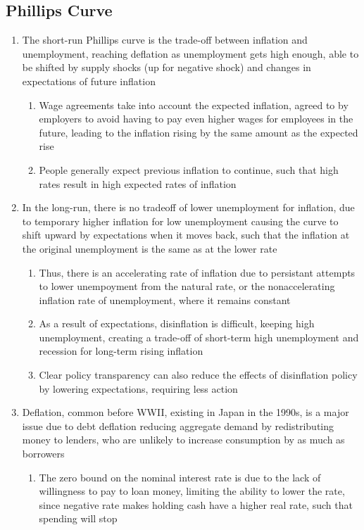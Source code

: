 \subsection{Phillips Curve}
\begin{enumerate}
\item The short-run Phillips curve is the trade-off between inflation and unemployment, reaching deflation as unemployment gets high enough, able to be shifted by supply shocks (up for negative shock) and changes in expectations of future inflation
\begin{enumerate}
\item Wage agreements take into account the expected inflation, agreed to by employers to avoid having to pay even higher wages for employees in the future, leading to the inflation rising by the same amount as the expected rise
\item People generally expect previous inflation to continue, such that high rates result in high expected rates of inflation
\end{enumerate}
\item In the long-run, there is no tradeoff of lower unemployment for inflation, due to temporary higher inflation for low unemployment causing the curve to shift upward by expectations when it moves back, such that the inflation at the original unemployment is the same as at the lower rate
\begin{enumerate}
\item Thus, there is an accelerating rate of inflation due to persistant attempts to lower unempoyment from the natural rate, or the nonaccelerating inflation rate of unemployment, where it remains constant
\item As a result of expectations, disinflation is difficult, keeping high unemployment, creating a trade-off of short-term high unemployment and recession for long-term rising inflation 
\item Clear policy transparency can also reduce the effects of disinflation policy by lowering expectations, requiring less action
\end{enumerate}
\item Deflation, common before WWII, existing in Japan in the 1990s, is a major issue due to debt deflation reducing aggregate demand by redistributing money to lenders, who are unlikely to increase consumption by as much as borrowers
\begin{enumerate}
\item The zero bound on the nominal interest rate is due to the lack of willingness to pay to loan money, limiting the ability to lower the rate, since negative rate makes holding cash have a higher real rate, such that spending will stop

\end{enumerate}
\end{enumerate}
